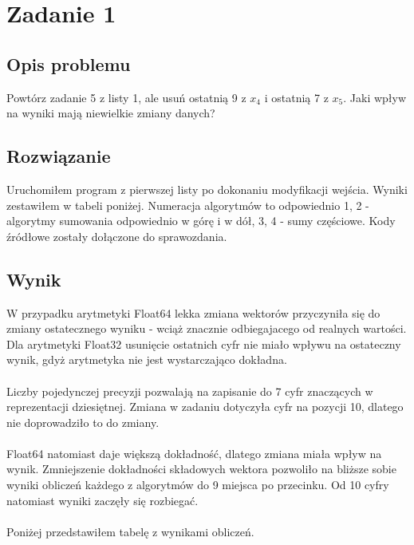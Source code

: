 \section{Zadanie 1}
\subsection{Opis problemu}
Powtórz zadanie 5 z listy 1, ale usuń ostatnią 9 z $ x_4 $ i ostatnią 7 z $ x_5 $. Jaki wpływ na
wyniki mają niewielkie zmiany danych?
\subsection{Rozwiązanie}
Uruchomiłem program z pierwszej listy po dokonaniu modyfikacji wejścia. Wyniki zestawiłem w tabeli poniżej. Numeracja algorytmów to odpowiednio 1, 2 - algorytmy sumowania odpowiednio w górę i w dół, 3, 4 - sumy częściowe. Kody źródłowe zostały dołączone do sprawozdania.
\subsection{Wynik}
W przypadku arytmetyki Float64 lekka zmiana wektorów przyczyniła się do zmiany ostatecznego wyniku - wciąż znacznie odbiegajacego od realnych wartości. Dla arytmetyki Float32 usunięcie ostatnich cyfr nie miało wpływu na ostateczny wynik, gdyż arytmetyka nie jest wystarczająco dokładna. \\\\
Liczby pojedynczej precyzji pozwalają na zapisanie do 7 cyfr znaczących w reprezentacji dziesiętnej. Zmiana w zadaniu dotyczyła cyfr na pozycji 10, dlatego nie doprowadziło to do zmiany.\\\\
Float64 natomiast daje większą dokładność, dlatego zmiana miała wpływ na wynik. Zmniejszenie dokładności składowych wektora pozwoliło na bliższe sobie wyniki obliczeń każdego z algorytmów do 9 miejsca po przecinku. Od 10 cyfry natomiast wyniki zaczęły się rozbiegać. \\\\
Poniżej przedstawiłem tabelę z wynikami obliczeń.

\begin{center}
  
  \end{center}